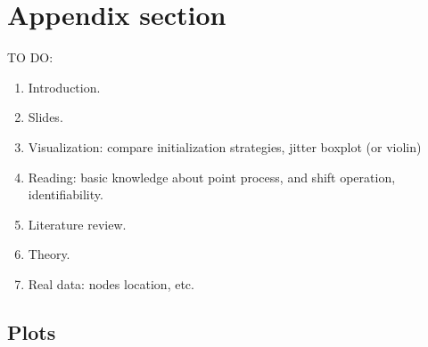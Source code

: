 
\appendix

\section{Appendix section}\label{app}

TO DO:
\begin{enumerate}
\item Introduction.
\item Slides.
\item Visualization: compare initialization strategies, jitter boxplot (or violin)
\item Reading: basic knowledge about point process, and shift operation, identifiability.
\item Literature review.
\item Theory.
\item Real data:  nodes location,  etc.
\end{enumerate}

\subsection{Plots}



